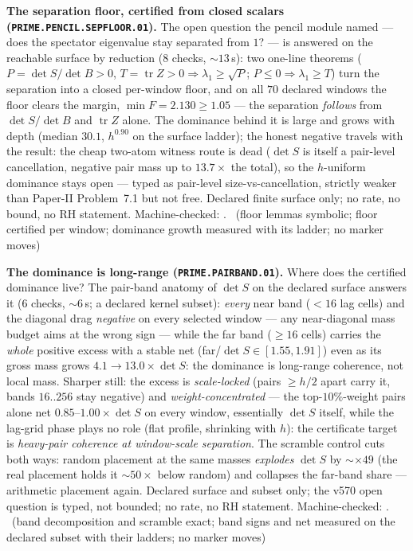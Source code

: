 \documentclass[11pt,a4paper]{article}
\theoremstyle{definition}
\begin{document}
\par\smallskip\noindent\textbf{The separation floor, certified from closed
scalars (\texttt{PRIME.PENCIL.SEPFLOOR.01}).}
The open question the pencil module named --- does the spectator eigenvalue
stay separated from $1$? --- is answered on the reachable surface by
reduction ($8$ checks, ${\sim}13$\,s): two one-line theorems
($P=\det S/\det B>0$, $T=\operatorname{tr}Z>0\Rightarrow\lambda_1\ge\sqrt P$;
$P\le0\Rightarrow\lambda_1\ge T$) turn the separation into a closed
per-window floor, and on all $70$ declared windows the floor clears the
margin, $\min F=2.130\ge1.05$ --- the separation \emph{follows} from
$\det S/\det B$ and $\operatorname{tr}Z$ alone. The dominance behind it is
large and grows with depth (median $30.1$, $h^{0.90}$ on the surface
ladder); the honest negative travels with the result: the cheap two-atom
witness route is dead ($\det S$ is itself a pair-level cancellation,
negative pair mass up to $13.7\times$ the total), so the $h$-uniform
dominance stays open --- typed as pair-level size-vs-cancellation, strictly
weaker than Paper-II Problem~7.1 but not free. Declared finite surface
only; no rate, no bound, no RH statement. Machine-checked:
.
\mE\ (floor lemmas symbolic; floor certified per window; dominance growth
measured with its ladder; no marker moves)
\par\smallskip

\par\smallskip\noindent\textbf{The dominance is long-range
(\texttt{PRIME.PAIRBAND.01}).}
Where does the certified dominance live?  The pair-band anatomy of
$\det S$ on the declared surface answers it ($6$ checks, ${\sim}6$\,s;
a declared kernel subset): \emph{every} near band ($<16$ lag cells) and
the diagonal drag \emph{negative} on every selected window --- any
near-diagonal mass budget aims at the wrong sign --- while the far band
($\ge16$ cells) carries the \emph{whole} positive excess with a stable
net (far/$\det S\in[1.55,1.91]$) even as its gross mass grows
$4.1\to13.0\times\det S$: the dominance is long-range coherence, not
local mass.  Sharper still: the excess is \emph{scale-locked} (pairs
$\ge h/2$ apart carry it, bands $16..256$ stay negative) and
\emph{weight-concentrated} --- the top-$10\%$-weight pairs alone net
$0.85$--$1.00\times\det S$ on every window, essentially $\det S$ itself,
while the lag-grid phase plays no role (flat profile, shrinking with
$h$): the certificate target is \emph{heavy-pair coherence at
window-scale separation}.  The scramble control cuts both ways: random
placement at the same masses \emph{explodes} $\det S$ by
${\sim}\times49$ (the real placement holds it ${\sim}50\times$ below
random) and collapses the far-band share --- arithmetic placement
again.  Declared surface and
subset only; the v570 open question is typed, not bounded; no rate, no
RH statement. Machine-checked:
.
\mE\ (band decomposition and scramble exact; band signs and net measured
on the declared subset with their ladders; no marker moves)
\par\smallskip
\end{document}
